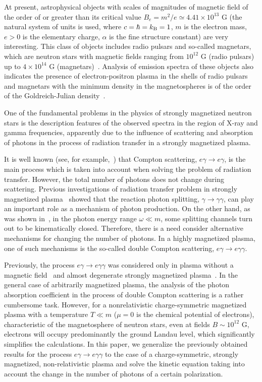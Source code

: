 \documentclass[
aps,%
12pt,%
final,%
notitlepage,%
oneside,%
onecolumn,%
nobibnotes,%
nofootinbib,%
superscriptaddress,%
noshowpacs,%
centertags]%
{revtex4}
\begin{document}
At present, astrophysical objects with scales of magnitudes of 
magnetic field of the order of or greater than its critical value $B_e = m^2/e \simeq 4.41\times10^{13}$ G
(the natural system of units is used, where $c = \hbar = k_{\rm{B}} = 1$, $m$ is the electron mass,
$e>0$ is the elementary charge, $\alpha$ is the fine structure constant) are very interesting.
This class of objects includes radio pulsars and so-called magnetars,
which are neutron stars with magnetic fields ranging from $10^{12}$ G
(radio pulsars) up to $4\times 10^{14}$ G (magnetars)~\cite{Olausen:2013bpa}.
Analysis of emission spectra of these objects
also indicates the presence of electron-positron plasma in the shells of radio pulsars and magnetars with
the minimum density in the magnetospheres is of the order of the Goldreich-Julian density~\cite{GJ:1969}.

One of the fundamental problems in the physics of strongly magnetized neutron stars is the description
features of the observed spectra in the region of X-ray and gamma frequencies, apparently due to
the influence of scattering and absorption of photons in the process of radiation transfer in 
a strongly magnetized plasma.

It is well known (see, for example,~\cite{Suleimanov:2007it}) that Compton scattering, 
$e \gamma \to e \gamma$, is the main process
which is taken into account when solving the problem of radiation transfer. 
However, the total number of photons does not change during scattering.
Previous investigations of radiation transfer problem in strongly
magnetized  plasma~\cite{RChSt:2012,RumChistShlen:2016}
 showed that the reaction photon splitting, $\gamma \to \gamma \gamma$, can play an important 
role as a mechanism of photon production. On the other hand, as was shown in~\cite{RChSt:2012}, 
in the photon energy range $\omega \ll m$, some splitting channels turn out to be 
kinematically closed. Therefore, there is a need
consider alternative mechanisms for changing the number of photons. In a highly magnetized plasma, one
of such mechanisms is the so-called double Compton scattering,
$e \gamma \to e \gamma \gamma$.


Previously, the process $e \gamma \to e \gamma \gamma$ was considered only in plasma without a 
magnetic field~\cite{LightmanApJ1981, Kellner1984} and almost degenerate strongly 
magnetized plasma~\cite{RumChistPuh2023}. In the general case of arbitrarily magnetized plasma, 
the analysis of the photon 
absorption coefficient in the process of double Compton scattering is a rather cumbersome task. However, 
for a nonrelativistic charge-symmetric magnetized plasma with a temperature $T \ll m$ ($\mu =0$ is the 
chemical potential of electrons),
characteristic of the magnetosphere of neutron stars, even at fields $B \sim 10^{12}$ G, electrons 
will occupy
predominantly the ground Landau level, which significantly simplifies the calculations. 
In this paper, we generalize the previously obtained results for the process 
$e \gamma \to e \gamma \gamma$ to the case of a charge-symmetric, strongly magnetized, non-relativistic 
plasma and solve the kinetic equation taking into account the change in the number of photons of 
a certain polarization.
\end{document}
